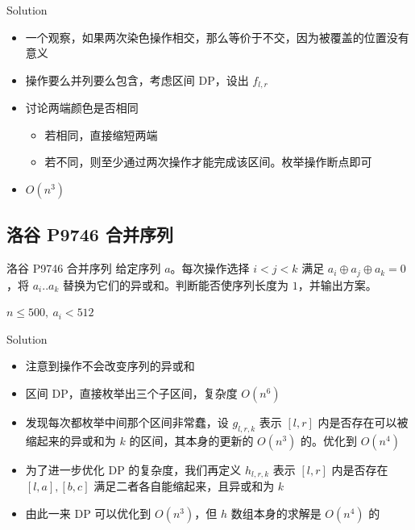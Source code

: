﻿\documentclass[aspectratio=169]{ctexbeamer}
\begin{document}
\begin{frame}{Solution}
    \begin{itemize}
        \item 一个观察，如果两次染色操作相交，那么等价于不交，因为被覆盖的位置没有意义
        \item 操作要么并列要么包含，考虑区间 DP，设出 $f_{l,r}$
        \item 讨论两端颜色是否相同
        \begin{itemize}
            \item 若相同，直接缩短两端
            \item 若不同，则至少通过两次操作才能完成该区间。枚举操作断点即可
        \end{itemize}
        \item $O(n^3)$
    \end{itemize}
\end{frame}













\subsection{洛谷 P9746 合并序列}
\begin{frame}{洛谷 P9746 合并序列}
    给定序列 $a$。每次操作选择 $i<j<k$ 满足 $a_i\oplus a_j\oplus a_k=0$，将 $a_i..a_k$ 替换为它们的异或和。判断能否使序列长度为 $1$，并输出方案。
    
    $n\le 500,\ a_i<512$
\end{frame}

\begin{frame}{Solution}
    \begin{itemize}
        \item 注意到操作不会改变序列的异或和
        \item 区间 DP，直接枚举出三个子区间，复杂度 $O(n^6)$
        \item 发现每次都枚举中间那个区间非常蠢，设 $g_{l,r,k}$ 表示 $[l,r]$ 内是否存在可以被缩起来的异或和为 $k$ 的区间，其本身的更新的 $O(n^3)$ 的。优化到 $O(n^4)$
        \item 为了进一步优化 DP 的复杂度，我们再定义 $h_{l,r,k}$ 表示 $[l,r]$ 内是否存在 $[l,a],[b,c]$ 满足二者各自能缩起来，且异或和为 $k$
        \item 由此一来 DP 可以优化到 $O(n^3)$，但 $h$ 数组本身的求解是 $O(n^4)$ 的
    \end{itemize}
\end{frame}
\end{document}
